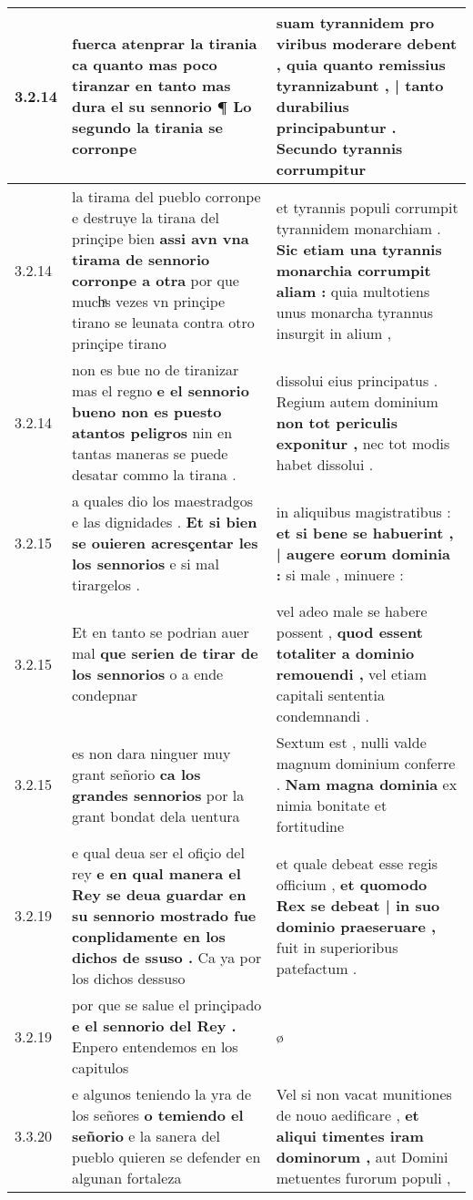 \begin{tabular}{|p{1cm}|p{6.5cm}|p{6.5cm}|}
3.2.14 & fuerca atenprar la tirania \textbf{ ca quanto mas poco tiranzar en tanto mas dura el su sennorio ¶ } Lo segundo la tirania se corronpe & suam tyrannidem pro viribus moderare debent , \textbf{ quia quanto remissius tyrannizabunt , | tanto durabilius principabuntur . } Secundo tyrannis corrumpitur \\\hline
3.2.14 & la tirama del pueblo corronpe e destruye la tirana del prinçipe bien \textbf{ assi avn vna tirama de sennorio corronpe a otra } por que muchͣs vezes vn prinçipe tirano se leunata contra otro prinçipe tirano & et tyrannis populi corrumpit tyrannidem monarchiam . \textbf{ Sic etiam una tyrannis monarchia corrumpit aliam : } quia multotiens unus monarcha tyrannus insurgit in alium , \\\hline
3.2.14 & non es bue no de tiranizar mas el regno \textbf{ e el sennorio bueno non es puesto atantos peligros } nin en tantas maneras se puede desatar commo la tirana . & dissolui eius principatus . Regium autem dominium \textbf{ non tot periculis exponitur , } nec tot modis habet dissolui . \\\hline
3.2.15 & a quales dio los maestradgos e las dignidades . \textbf{ Et si bien se ouieren acresçentar les los sennorios } e si mal tirargelos . & in aliquibus magistratibus : \textbf{ et si bene se habuerint , | augere eorum dominia : } si male , minuere : \\\hline
3.2.15 & Et en tanto se podrian auer mal \textbf{ que serien de tirar de los sennorios } o a ende condepnar & vel adeo male se habere possent , \textbf{ quod essent totaliter a dominio remouendi , } vel etiam capitali sententia condemnandi . \\\hline
3.2.15 & es non dara ninguer muy grant señorio \textbf{ ca los grandes sennorios } por la grant bondat dela uentura & Sextum est , nulli valde magnum dominium conferre . \textbf{ Nam magna dominia } ex nimia bonitate et fortitudine \\\hline
3.2.19 & e qual deua ser el ofiçio del rey \textbf{ e en qual manera el Rey se deua guardar en su sennorio mostrado fue conplidamente en los dichos de ssuso . } Ca ya por los dichos dessuso & et quale debeat esse regis officium , \textbf{ et quomodo Rex se debeat | in suo dominio praeseruare , } fuit in superioribus patefactum . \\\hline
3.2.19 & por que se salue el prinçipado \textbf{ e el sennorio del Rey . } Enpero entendemos en los capitulos & ø \\\hline
3.3.20 & e algunos teniendo la yra de los señores \textbf{ o temiendo el señorio } e la sanera del pueblo quieren se defender en algunan fortaleza & Vel si non vacat munitiones de nouo aedificare , \textbf{ et aliqui timentes iram dominorum , } aut Domini metuentes furorum populi , \\\hline

\end{tabular}
